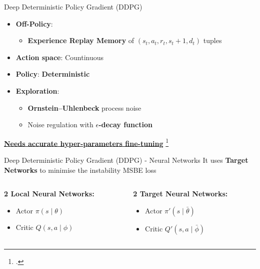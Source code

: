 \documentclass[aspectratio=169]{beamer}
\begin{document}
	\begin{frame}{Deep Deterministic Policy Gradient (DDPG)}
		\centering
		\begin{itemize}
			\item \textbf{Off-Policy}:\begin{itemize}
				\item \alert{\textbf{Experience Replay Memory}} of $(s_t, a_t, r_t, s_t+1, d_t)$ tuples
			\end{itemize}
			\item \textbf{Action space}: Countinuous
			\item \textbf{Policy}: \alert{\textbf{Deterministic}}
			\item \textbf{Exploration}: \begin{itemize}
				\item \alert{\textbf{Ornstein–Uhlenbeck}} process noise
				\item Noise regulation with \alert{\textbf{$\epsilon$-decay function}}
			\end{itemize}
		\end{itemize}
		\textbf{\underline{Needs accurate hyper-parameters fine-tuning}}
		\footcite*{lillicrap2015continuous}
	\end{frame}
	
	\begin{frame}{Deep Deterministic Policy Gradient (DDPG) - Neural Networks}
		\centering
		It uses \textbf{Target Networks} to minimise the instability MSBE loss
		\vspace{10mm}
		\begin{columns}
			\begin{column}{0.5\linewidth}
				\textbf{2 Local Neural Networks:}
				\begin{itemize}
					\item Actor $\pi(s \;|\; \theta)$ 
					\item Critic $Q(s, a \;|\; \phi)$
				\end{itemize}
			\end{column}
			\begin{column}{0.5\textwidth}
				\textbf{2 Target Neural Networks:}
				\begin{itemize}
					\item Actor $\pi'(s \;|\; \bar{\theta})$
					\item Critic $Q'(s, a \;|\; \bar{\phi})$
				\end{itemize}
			\end{column}
		\end{columns}
	\end{frame}
	
\end{document}
